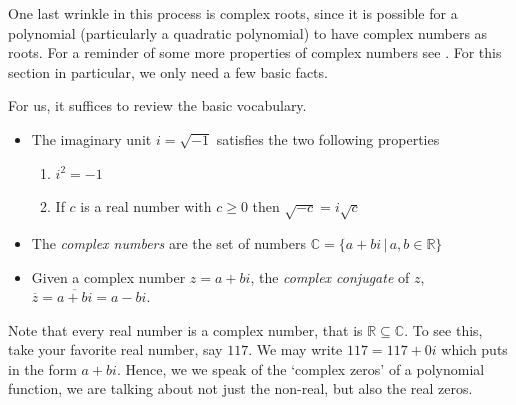 One last wrinkle in this process is complex roots, since it is possible for a polynomial (particularly a quadratic polynomial) to have complex numbers as roots. For a reminder of some more properties of complex numbers see . For this section in particular, we only need a few basic facts.

For us, it suffices to review the basic vocabulary.

\begin{definition}  

\begin{itemize}
 
\item The imaginary unit $i = \sqrt{-1}$ satisfies the two following properties

\begin{enumerate}

\item  $i^2 = -1$

\item  If $c$ is a real number with $c \geq 0$ then $\sqrt{-c} = i \sqrt{c}$

\end{enumerate}

\item The \emph{complex numbers} are the set of numbers $\mathbb{C} = \{ a + bi \, | \, a, b \in \mathbb{R} \}$

\item  Given a complex number $z = a+bi$, the \emph{complex conjugate} of $z$, $\overline{z}  = \overline{a+bi} = a - bi$.

\end{itemize}

\end{definition}

Note that every real number is a complex number, that is $\mathbb{R} \subseteq \mathbb{C}$.  To see this, take your favorite real number, say $117$.  We may write $117 = 117 + 0 i$ which puts in the form $a + bi$.  Hence, we we speak of the `complex zeros' of a polynomial function, we are talking about not just the non-real, but also the real zeros.

